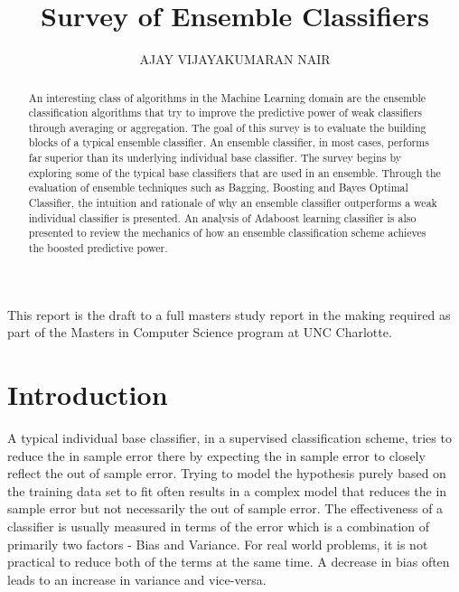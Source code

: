 \documentclass{acmtog} %
\begin{document}

\title{Survey of Ensemble Classifiers} %

\author{AJAY VIJAYAKUMARAN NAIR 
}


\maketitle

\begin{bottomstuff}
This report is the draft to a full masters study report in the making required as part of the Masters in Computer Science program at UNC Charlotte.
\end{bottomstuff}

\begin{abstract}
An interesting class of algorithms in the Machine Learning domain are the ensemble classification algorithms that try to improve the predictive power of weak classifiers through averaging or aggregation. The goal of this survey is to evaluate the building blocks of a typical ensemble classifier. An ensemble classifier, in most cases, performs far superior than its underlying individual base classifier. The survey begins by exploring some of the typical base classifiers that are used in an ensemble. Through the evaluation of ensemble techniques such as Bagging, Boosting and Bayes Optimal Classifier, the intuition and rationale of why an ensemble classifier outperforms a weak individual classifier is presented. An analysis of Adaboost learning classifier is also presented to review the mechanics of how an ensemble classification scheme achieves the boosted predictive power.
\end{abstract}

\section{Introduction}
A typical individual base classifier, in a supervised classification scheme, tries to reduce the in sample error there by expecting the in sample error to closely reflect the out of sample error. Trying to model the hypothesis purely based on the training data set to fit often results in a complex model that reduces the in sample error but not necessarily the out of sample error. The effectiveness of a classifier is usually measured in terms of the error which is a combination of primarily two factors - Bias and Variance. For real world problems, it is not practical to reduce both of the terms at the same time. A decrease in bias often leads to an increase in variance and vice-versa.
\end{document}
